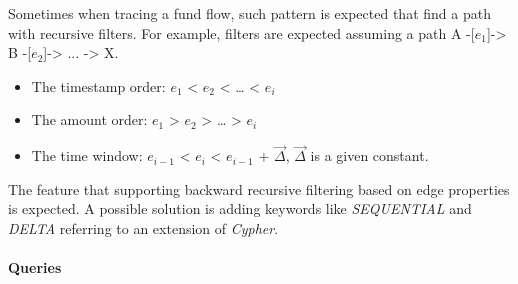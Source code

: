 
Sometimes when tracing a fund flow, such pattern is expected that find a path with recursive filters.
For example, filters are expected assuming a path A -[${e_1}$]-> B -[${e_2}$]-> ... -> X.

\begin{itemize}
    \item The timestamp order: ${e_1}$ < ${e_2}$ < … < ${e_i}$
    \item The amount order: ${e_1}$ > ${e_2}$ > … > ${e_i}$
    \item The time window: ${e_{i-1}}$ < ${e_i}$ < ${e_{i-1}}$ + $\vec{\Delta}$, $\vec{\Delta}$ is a given constant.
\end{itemize}


The feature that supporting backward recursive filtering based on edge properties is expected. A possible solution is adding keywords like \emph{SEQUENTIAL} and \emph{DELTA} referring to an extension of \emph{Cypher}\cite{tcypher}.


\paragraph{Queries}
{\raggedright

}